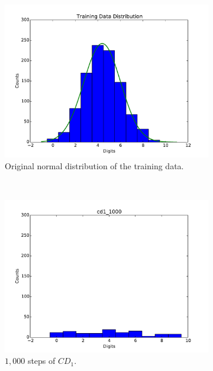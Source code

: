 \begin{figure}[hbt]
  \centering
  		\begin{subfigure}[t]{0.38\textwidth}
  			\includegraphics[width=\textwidth]{pics_sdbn/train_data_v.pdf}
  		    \caption{Original normal distribution of the training data.}
  		\end{subfigure}\\
  		\begin{subfigure}[t]{0.18\textwidth}
  			\includegraphics[width=\textwidth]{pics_sdbn/gibbs_cd1_1000.pdf}
  		    \caption{$1,000$ steps of $CD_1$.}
  		\end{subfigure}
  		\begin{subfigure}[t]{0.18\textwidth}

\end{subfigure}
\end{figure}
